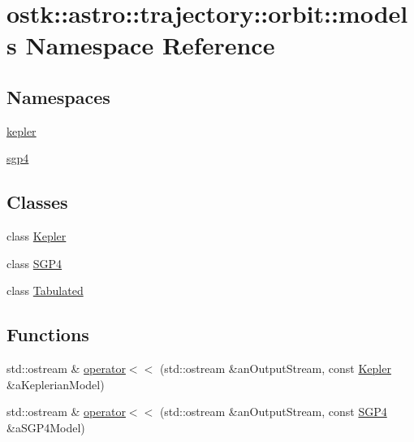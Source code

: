 \hypertarget{namespaceostk_1_1astro_1_1trajectory_1_1orbit_1_1models}{}\section{ostk\+:\+:astro\+:\+:trajectory\+:\+:orbit\+:\+:models Namespace Reference}
\label{namespaceostk_1_1astro_1_1trajectory_1_1orbit_1_1models}
\subsection*{Namespaces}
\begin{DoxyCompactItemize}
\item 
 \hyperlink{namespaceostk_1_1astro_1_1trajectory_1_1orbit_1_1models_1_1kepler}{kepler}
\item 
 \hyperlink{namespaceostk_1_1astro_1_1trajectory_1_1orbit_1_1models_1_1sgp4}{sgp4}
\end{DoxyCompactItemize}
\subsection*{Classes}
\begin{DoxyCompactItemize}
\item 
class \hyperlink{classostk_1_1astro_1_1trajectory_1_1orbit_1_1models_1_1_kepler}{Kepler}
\item 
class \hyperlink{classostk_1_1astro_1_1trajectory_1_1orbit_1_1models_1_1_s_g_p4}{S\+G\+P4}
\item 
class \hyperlink{classostk_1_1astro_1_1trajectory_1_1orbit_1_1models_1_1_tabulated}{Tabulated}
\end{DoxyCompactItemize}
\subsection*{Functions}
\begin{DoxyCompactItemize}
\item 
std\+::ostream \& \hyperlink{namespaceostk_1_1astro_1_1trajectory_1_1orbit_1_1models_a57c1332ade54f2075a0efee474d5b46d}{operator$<$$<$} (std\+::ostream \&an\+Output\+Stream, const \hyperlink{classostk_1_1astro_1_1trajectory_1_1orbit_1_1models_1_1_kepler}{Kepler} \&a\+Keplerian\+Model)
\item 
std\+::ostream \& \hyperlink{namespaceostk_1_1astro_1_1trajectory_1_1orbit_1_1models_a5683eb8d1e09c5efb5f98e43a439284c}{operator$<$$<$} (std\+::ostream \&an\+Output\+Stream, const \hyperlink{classostk_1_1astro_1_1trajectory_1_1orbit_1_1models_1_1_s_g_p4}{S\+G\+P4} \&a\+S\+G\+P4\+Model)
\end{DoxyCompactItemize}


